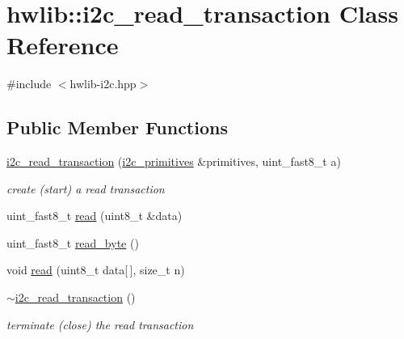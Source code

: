 \hypertarget{classhwlib_1_1i2c__read__transaction}{}\section{hwlib\+:\+:i2c\+\_\+read\+\_\+transaction Class Reference}
\label{classhwlib_1_1i2c__read__transaction}


{\ttfamily \#include $<$hwlib-\/i2c.\+hpp$>$}

\subsection*{Public Member Functions}
\begin{DoxyCompactItemize}
\item 
\mbox{\label{classhwlib_1_1i2c__read__transaction_ac88e81cebe07d775147379f080867550}} 
\hyperlink{classhwlib_1_1i2c__read__transaction_ac88e81cebe07d775147379f080867550}{i2c\+\_\+read\+\_\+transaction} (\hyperlink{classhwlib_1_1i2c__primitives}{i2c\+\_\+primitives} \&primitives, uint\+\_\+fast8\+\_\+t a)
\begin{DoxyCompactList}\small\item\em create (start) a read transaction \end{DoxyCompactList}\item 
uint\+\_\+fast8\+\_\+t \hyperlink{classhwlib_1_1i2c__read__transaction_a624e7979dcf697e748955bace4cf2273}{read} (uint8\+\_\+t \&data)
\item 
uint\+\_\+fast8\+\_\+t \hyperlink{classhwlib_1_1i2c__read__transaction_a404a7d9db0ddd18aaeac84b266e89f9e}{read\+\_\+byte} ()
\item 
void \hyperlink{classhwlib_1_1i2c__read__transaction_a4c886112d92dddb502cb18a18c3a385f}{read} (uint8\+\_\+t data\mbox{[}$\,$\mbox{]}, size\+\_\+t n)
\item 
\mbox{\label{classhwlib_1_1i2c__read__transaction_af1fab5e9582c503f62e257b3af739220}} 
\hyperlink{classhwlib_1_1i2c__read__transaction_af1fab5e9582c503f62e257b3af739220}{$\sim$i2c\+\_\+read\+\_\+transaction} ()
\begin{DoxyCompactList}\small\item\em terminate (close) the read transaction \end{DoxyCompactList}\end{DoxyCompactItemize}


